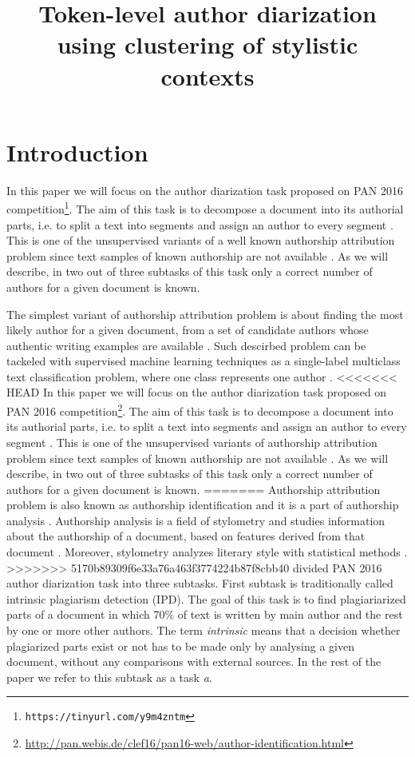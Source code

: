 \documentclass[10pt, a4paper]{article}
\title{Token-level author diarization using clustering of stylistic contexts}
\begin{document}
\maketitleabstract

\section{Introduction}
In this paper we will focus on the author diarization task proposed on PAN 2016 competition\footnote{\texttt{https://tinyurl.com/y9m4zntm}}. The aim of this task is to decompose a document into its authorial parts, i.e. to split a text into segments and assign an author to every segment \citep{koppel-2011,aldebei-2015}. This is one of the unsupervised variants of a well known authorship attribution problem since text samples of known authorship are not available \citep{rosso-2016}. As we will describe, in two out of three subtasks of this task only a correct number of authors for a given document is known.

The simplest variant of authorship attribution problem is about finding the most likely author for a given document, from a set of candidate authors whose authentic writing examples are available \citep{stamatatos-2009a,stein-2011,ding-2016}. Such descirbed problem can be tackeled with supervised machine learning techniques as a single-label multiclass text classification problem, where one class represents one author \citep{stamatatos-2009a}. 
<<<<<<< HEAD
In this paper we will focus on the author diarization task proposed on PAN 2016 competition\footnote{\url{http://pan.webis.de/clef16/pan16-web/author-identification.html}}. The aim of this task is to decompose a document into its authorial parts, i.e. to split a text into segments and assign an author to every segment \citep{koppel-2011,aldebei-2015}. This is one of the unsupervised variants of authorship attribution problem since text samples of known authorship are not available \citep{rosso-2016}. As we will describe, in two out of three subtasks of this task only a correct number of authors for a given document is known.
=======
Authorship attribution problem is also known as authorship identification and it is a part of authorship analysis \citep{stamatatos-2009a,ding-2016}. Authorship analysis is a field of stylometry and studies information about the authorship of a document, based on features derived from that document \citep{layton-2013}. Moreover, stylometry analyzes literary style with statistical methods \citep{stein-2011}.
>>>>>>> 5170b89309f6e33a76a463f3774224b87f8cbb40
\citet{rosso-2016} divided PAN 2016 author diarization task into three subtasks. First subtask is traditionally called intrinsic plagiarism detection (IPD). The goal of this task is to find plagiariarized parts of a document in which 70\% of text is written by main author and the rest by one or more other authors. The term \textit{intrinsic} means that a decision whether plagiarized parts exist or not has to be made only by analysing a given document, without any comparisons with external sources. In the rest of the paper we refer to this subtask as a task \textit{a}.
\end{document}
